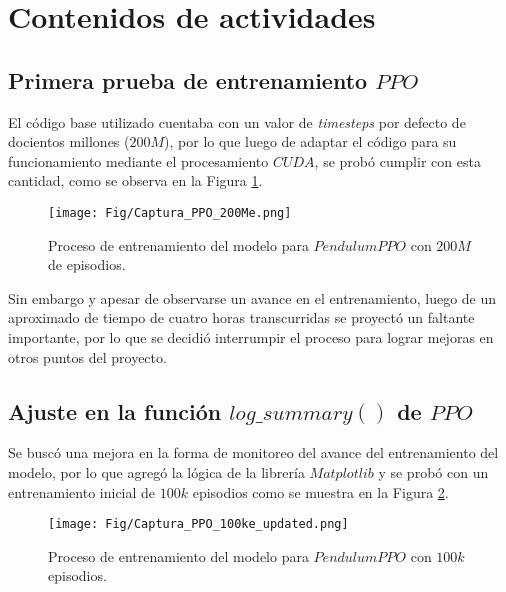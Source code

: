\documentclass[12pt]{article}
\begin{document}

\section*{Contenidos de actividades}

\subsection*{Primera prueba de entrenamiento $PPO$}

El código base utilizado \cite{PPObeginners} cuentaba con un valor de \textit{timesteps} por defecto de docientos millones ($200M$), por lo que luego de adaptar el código para su funcionamiento mediante el procesamiento $CUDA$, se probó cumplir con esta cantidad, como se observa en la Figura \ref{fig:PendPPOv1}.

\begin{figure}[h!]
	\centering
	\texttt{[image: Fig/Captura\_PPO\_200Me.png]}
	\caption{Proceso de entrenamiento del modelo para $PendulumPPO$ con $200M$ de episodios.}
	\label{fig:PendPPOv1}
\end{figure}	

Sin embargo y apesar de observarse un avance en el entrenamiento, luego de un aproximado de tiempo de cuatro horas transcurridas se proyectó un faltante importante, por lo que se decidió interrumpir el proceso para lograr mejoras en otros puntos del proyecto.

\subsection*{Ajuste en la función $log\_summary()$ de $PPO$}

Se buscó una mejora en la forma de monitoreo del avance del entrenamiento del modelo, por lo que agregó la lógica de la librería $Matplotlib$ y se probó con un entrenamiento inicial de $100k$ episodios como se muestra en la Figura \ref{fig:PendPPOv2}.

\begin{figure}[h!]
	\centering
	\texttt{[image: Fig/Captura\_PPO\_100ke\_updated.png]}
	\caption{Proceso de entrenamiento del modelo para $PendulumPPO$ con $100k$ episodios.}
	\label{fig:PendPPOv2}
\end{figure}
\end{document}
